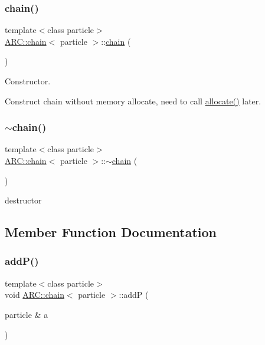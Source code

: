 \subsubsection{\texorpdfstring{chain()}{chain()}\hspace{0.1cm}{\footnotesize\ttfamily [2/2]}}
{\footnotesize\ttfamily template$<$class particle$>$ \\
\hyperlink{classARC_1_1chain}{A\+R\+C\+::chain}$<$ particle $>$\+::\hyperlink{classARC_1_1chain}{chain} (\begin{DoxyParamCaption}{ }\end{DoxyParamCaption})\hspace{0.3cm}{\ttfamily [inline]}}



Constructor. 

Construct chain without memory allocate, need to call \hyperlink{classARC_1_1chain_ad0abd7b957e9d88ad2f1823f06d28a4a}{allocate()} later. \hypertarget{classARC_1_1chain_a3467a68afb2daebec6c57899897a461c}{}\label{classARC_1_1chain_a3467a68afb2daebec6c57899897a461c} 
\subsubsection{\texorpdfstring{$\sim$chain()}{~chain()}}
{\footnotesize\ttfamily template$<$class particle$>$ \\
\hyperlink{classARC_1_1chain}{A\+R\+C\+::chain}$<$ particle $>$\+::$\sim$\hyperlink{classARC_1_1chain}{chain} (\begin{DoxyParamCaption}{ }\end{DoxyParamCaption})\hspace{0.3cm}{\ttfamily [inline]}}



destructor 



\subsection{Member Function Documentation}
\hypertarget{classARC_1_1chain_a0f91c399beb1e5c0db6ed7e2b4d00477}{}\label{classARC_1_1chain_a0f91c399beb1e5c0db6ed7e2b4d00477} 
\subsubsection{\texorpdfstring{add\+P()}{addP()}\hspace{0.1cm}{\footnotesize\ttfamily [1/3]}}
{\footnotesize\ttfamily template$<$class particle$>$ \\
void \hyperlink{classARC_1_1chain}{A\+R\+C\+::chain}$<$ particle $>$\+::addP (\begin{DoxyParamCaption}\item[{particle \&}]{a }\end{DoxyParamCaption})\hspace{0.3cm}{\ttfamily [inline]}}



